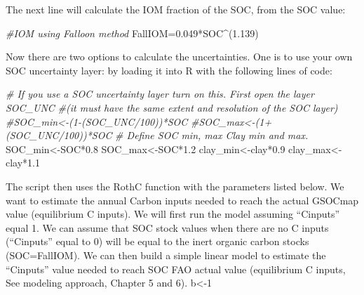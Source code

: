 \documentclass[
  10pt,
  b5paper,
]{book}
\newenvironment{Shaded}{\begin{snugshade}}{\end{snugshade}}
\newcommand{\CommentTok}[1]{\textcolor[rgb]{0.56,0.35,0.01}{\textit{#1}}}
\newcommand{\FloatTok}[1]{\textcolor[rgb]{0.00,0.00,0.81}{#1}}
\newcommand{\NormalTok}[1]{#1}
\newcommand{\OtherTok}[1]{\textcolor[rgb]{0.56,0.35,0.01}{#1}}
\newcommand{\SpecialCharTok}[1]{\textcolor[rgb]{0.00,0.00,0.00}{#1}}
\begin{document}
The next line will calculate the IOM fraction of the SOC, from the SOC value:

\begin{Shaded}
\begin{Highlighting}[]
\CommentTok{\#IOM using Falloon method}
\NormalTok{FallIOM}\OtherTok{=}\FloatTok{0.049}\SpecialCharTok{*}\NormalTok{SOC}\SpecialCharTok{\^{}}\NormalTok{(}\FloatTok{1.139}\NormalTok{) }
\end{Highlighting}
\end{Shaded}

Now there are two options to calculate the uncertainties. One is to use your own SOC uncertainty layer: by loading it into R with the following lines of code:

\begin{Shaded}
\begin{Highlighting}[]
\CommentTok{\# If you use a SOC uncertainty layer turn on this. First open the layer SOC\_UNC }
\CommentTok{\#(it must have the same extent and resolution of the SOC layer)}
\CommentTok{\#SOC\_min\textless{}{-}(1{-}(SOC\_UNC/100))*SOC}
\CommentTok{\#SOC\_max\textless{}{-}(1+(SOC\_UNC/100))*SOC}
\CommentTok{\# Define SOC min, max Clay min and max. }
\NormalTok{SOC\_min}\OtherTok{\textless{}{-}}\NormalTok{SOC}\SpecialCharTok{*}\FloatTok{0.8}
\NormalTok{SOC\_max}\OtherTok{\textless{}{-}}\NormalTok{SOC}\SpecialCharTok{*}\FloatTok{1.2}
\NormalTok{clay\_min}\OtherTok{\textless{}{-}}\NormalTok{clay}\SpecialCharTok{*}\FloatTok{0.9}
\NormalTok{clay\_max}\OtherTok{\textless{}{-}}\NormalTok{clay}\SpecialCharTok{*}\FloatTok{1.1}
\end{Highlighting}
\end{Shaded}

The script then uses the RothC function with the parameters listed below. We want to estimate the annual Carbon inputs needed to reach the actual GSOCmap value (equilibrium C inputs). We will first run the model assuming ``Cinputs'' equal 1. We can assume that SOC stock values when there are no C inputs (``Cinputs'' equal to 0) will be equal to the inert organic carbon stocks (SOC=FallIOM). We can then build a simple linear model to estimate the ``Cinputs'' value needed to reach SOC FAO actual value (equilibrium C inputs, See modeling approach, Chapter 5 and 6).
b\textless-1
\end{document}
